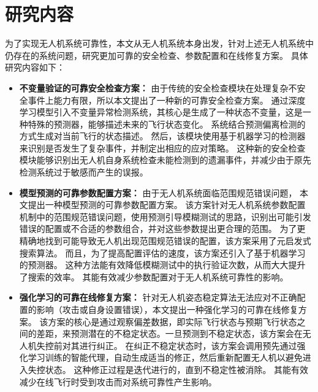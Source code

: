\section{研究内容}
为了实现无人机系统可靠性，本文从无人机系统本身出发，针对上述无人机系统中仍存在的系统问题，研究更加可靠的安全检查、参数配置和在线修复方案。
具体研究内容如下：
\begin{itemize}
    \item \textbf{不变量验证的可靠安全检查方案：} 
    由于传统的安全检查模块在处理复杂不安全事件上能力有限，所以本文提出了一种新的可靠安全检查方案。
    通过深度学习模型引入不变量异常检测系统，其核心是生成了一种状态不变量，这是一种特殊的预测器，能够描述未来的飞行状态变化。
    系统结合预测偏离检测的方式生成对当前飞行的状态描述。
    然后，该模块使用基于机器学习的检测器来识别是否发生了复杂事件，并制定出相应的应对策略。
    这种新的安全检查模块能够识别出无人机自身系统检查未能检测到的遗漏事件，并减少由于原先检测系统过于敏感而产生的误报。

    
    \item \textbf{模型预测的可靠参数配置方案：} 
    由于无人机系统面临范围规范错误问题， 本文提出一种模型预测的可靠参数配置方案。
    该方案针对无人机系统参数配置机制中的范围规范错误问题，使用预测引导模糊测试的思路，识别出可能引发错误的配置或不合适的参数组合，并对这些参数提出更合理的范围。
    为了更精确地找到可能导致无人机出现范围规范错误的配置，该方案采用了元启发式搜索算法。
    而且，为了提高配置评估的速度，该方案还引入了基于机器学习的预测器。
    这种方法能有效降低模糊测试中的执行验证次数，从而大大提升了搜索的效率。
    其能有效减少参数配置对于无人机系统可靠性的影响。
    
    
    \item \textbf{强化学习的可靠在线修复方案：} 
    针对无人机姿态稳定算法无法应对不正确配置的影响（攻击或自身设置错误），本文提出一种强化学习的可靠在线修复方案。
    该方案的核心是通过观察偏差数据，即实际飞行状态与预期飞行状态之间的差距，来预测潜在的不稳定状态。一旦预测到不稳定状态，该方案会在无人机失控前对其进行纠正。
    在纠正不稳定状态时，该方案会调用预先通过强化学习训练的智能代理，自动生成适当的修正，然后重新配置无人机以避免进入失控状态。
    这种修正过程是迭代进行的，直到不稳定性被消除。
    其能有效减少在线飞行时受到攻击而对系统可靠性产生影响。
    
\end{itemize}

    
